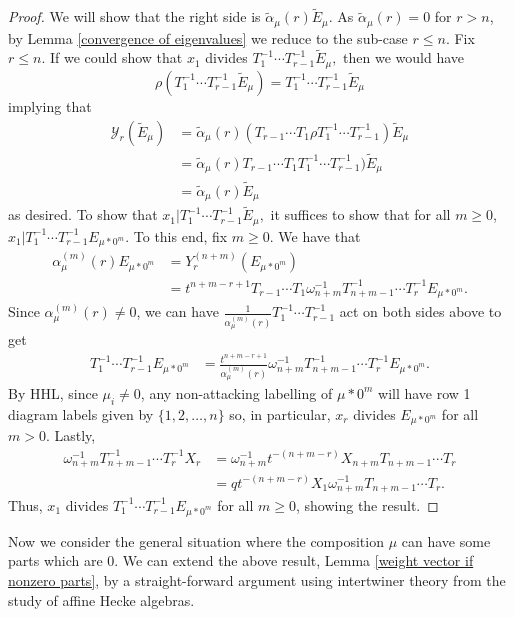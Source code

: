 \documentclass[11pt]{article}
\theoremstyle{definition}
\numberwithin{equation}{section}
\newcommand{\y}{{ \mathscr{Y} }}
\begin{document}
\begin{proof}
We will show that the right side is $\widetilde{\alpha}_{\mu}(r)\widetilde{E}_{\mu}$.
As $\widetilde{\alpha}_{\mu}(r) = 0$ for $r > n$, by Lemma \ref{convergence of eigenvalues} we reduce to the sub-case $r \leq n$. Fix $r \leq n$. 
If we could show that $x_1$ divides $ T_1^{-1}\cdots T_{r-1}^{-1}\widetilde{E}_{\mu},$ then we would have $$\rho(T_1^{-1}\cdots T_{r-1}^{-1}\widetilde{E}_{\mu}) = T_1^{-1}\cdots T_{r-1}^{-1}\widetilde{E}_{\mu} $$
implying that 
\begin{align*}
\y_r(\widetilde{E}_{\mu}) &= \widetilde{\alpha}_{\mu}(r) (T_{r-1}\cdots T_1 \rho T_1^{-1}\cdots T_{r-1}^{-1}) \widetilde{E}_{\mu} \\
&= \widetilde{\alpha}_{\mu}(r) T_{r-1}\cdots T_1 T_1^{-1}\cdots T_{r-1}^{-1}) \widetilde{E}_{\mu} \\
&= \widetilde{\alpha}_{\mu}(r)\widetilde{E}_{\mu}
\end{align*}
as desired.
To show that $x_1 | T_1^{-1}\cdots T_{r-1}^{-1}\widetilde{E}_{\mu},$ it suffices to show that for all $m \geq 0$,
$x_1 | T_1^{-1}\cdots T_{r-1}^{-1} E_{\mu *0^m}$. To this end, fix $m \geq 0$. We have that 
\begin{align*}
\alpha_{\mu}^{(m)}(r)E_{\mu*0^m}&= Y_r^{(n+m)}(E_{\mu*0^m}) \\
&= t^{n+m-r+1}T_{r-1}\cdots T_1 \omega_{n+m}^{-1} T_{n+m-1}^{-1}\cdots T_r^{-1} E_{\mu*0^m}.
\end{align*}
Since $\alpha_{\mu}^{(m)}(r) \neq 0$, we can have $\frac{1}{\alpha_{\mu}^{(m)}(r)} T_1 ^{-1}\cdots T_{r-1}^{-1}$ act on both sides above to get 
\begin{align*}
T_1^{-1}\cdots T_{r-1}^{-1} E_{\mu*0^m} &= \frac{t^{n+m-r+1}}{\alpha_{\mu}^{(m)}(r)}\omega_{n+m}^{-1} T_{n+m-1}^{-1}\cdots T_r^{-1} E_{\mu*0^m}.
\end{align*}
 By HHL, since $\mu_i \neq 0$, any non-attacking labelling of $\mu* 0^m$ will have row 1 diagram labels given by $\{1,2,\ldots,n\}$ so, in particular, $x_r$ divides $E_{\mu*0^m}$ for all $m > 0$. Lastly, 
 \begin{align*}
\omega_{n+m}^{-1} T_{n+m-1}^{-1}\cdots T_r^{-1}X_r &= \omega_{n+m}^{-1} t^{-(n+m-r)}X_{n+m}T_{n+m-1}\cdots T_r \\
&= qt^{-(n+m-r)} X_1 \omega_{n+m}^{-1} T_{n+m-1}\cdots T_r.
 \end{align*}
Thus, $x_1$ divides $T_1^{-1}\cdots T_{r-1}^{-1} E_{\mu*0^m}$ for all $m \geq 0$, showing the result.
\end{proof}

Now we consider the general situation where the composition $\mu$ can have some parts which are 0. We can extend the above result, Lemma \ref{weight vector if nonzero parts}, by a straight-forward argument using intertwiner theory from the study of affine Hecke algebras.
\end{document}
